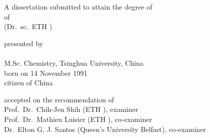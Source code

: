 \begin{titlepage}
  \makeatletter
	\begin{addmargin}[0.5cm]{-0.5cm}
    \begin{center}
        \large
        \begingroup
            {\large {}}
        \endgroup

        \hfill

        \vfill

        \begingroup
        {\LARGE \myTitle}
        \endgroup

        \vfill

        \begingroup
            A dissertation submitted to attain the degree of\\
            \vspace{0.5em}
            of
             \\
            (Dr.\ sc.\ ETH \zurich)
        \endgroup

        \vfill

        \begingroup
            presented by\\
            \vspace{0.5em}
            {\Huge \ct@caps \myName}\\
            \vspace{2 em}
            M.Sc. Chemistry, Tsinghua University, China \\
            born on 14 November 1991\\
            citizen of China
        \endgroup

        \vfill

        \begingroup
            accepted on the recommendation of\\
            \vspace{0.5em}
            Prof.\ Dr.\ Chih-Jen Shih (ETH \zurich{}), examiner\\
            Prof.\ Dr.\  Mathieu Luisier (ETH \zurich{}), co-examiner\\
            Dr.\ Elton G. J. Santos (Queen's University Belfast), co-examiner\\
        \endgroup

        \vfill

        \myTime%

        \vfill
    \end{center}
  \end{addmargin}
  \makeatother
\end{titlepage}
